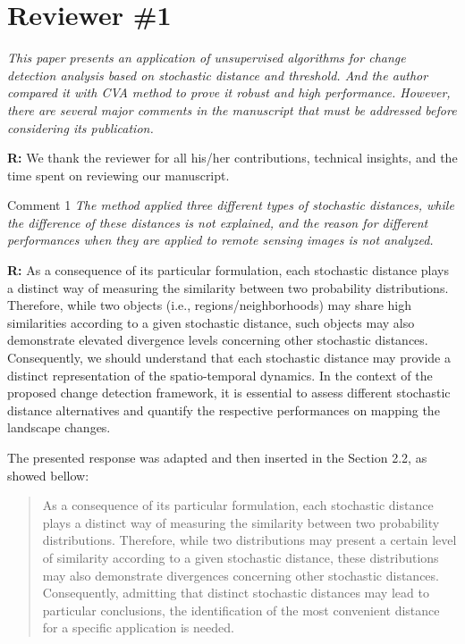 \documentclass[11pt]{report}
\begin{document}
\section*{Reviewer \#1}

\textit{This paper presents an application of unsupervised algorithms for change detection analysis based on stochastic distance and threshold. And the author compared it with CVA method to prove it robust and high performance. However, there are several major comments in the manuscript that must be addressed before considering its publication.}

\medskip

\textbf{R:} We thank the reviewer for all his/her contributions, technical insights, and the time spent on reviewing our manuscript.

\medskip


\medskip
\begin{mybox}{Comment 1}
\textit{The method applied three different types of stochastic distances, while the difference of these distances is not explained, and the reason for different performances when they are applied to remote sensing images is not analyzed.}

\medskip

\textbf{R:} As a consequence of its particular formulation, each stochastic distance plays a distinct way of measuring the similarity between two probability distributions. Therefore, while two objects (i.e., regions/neighborhoods) may share high similarities according to a given stochastic distance, such objects may also demonstrate elevated divergence levels concerning other stochastic distances.
Consequently, we should understand that each stochastic distance may provide a distinct representation of the spatio-temporal dynamics.
In the context of the proposed change detection framework, it is essential to assess different stochastic distance alternatives and quantify the respective performances on mapping the landscape changes. 


\medskip

The presented response was adapted and then inserted in the Section 2.2, as showed bellow:
\begin{quotation}

As a consequence of its particular formulation, each stochastic distance plays a distinct way of measuring the similarity between two probability distributions.
Therefore, while two distributions may present a certain level of similarity according to a given stochastic distance, these distributions may also demonstrate divergences concerning other stochastic distances.
Consequently, admitting that distinct stochastic distances may lead to particular conclusions, the identification of the most convenient distance for a specific application is needed.

\end{quotation}



\end{mybox}
\end{document}
